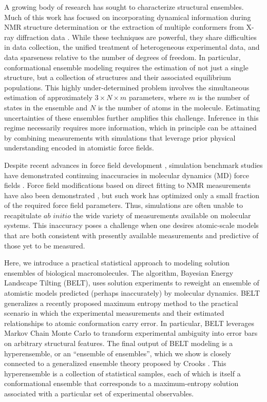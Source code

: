 \documentclass[12pt]{article}
\begin{document}
A growing body of research has sought to characterize structural ensembles.  Much of this work has focused on incorporating dynamical information during NMR structure determination  \cite{lindorff2005simultaneous, lange2008recognition} or the extraction of multiple conformers from X-ray diffraction data  \cite{depristo2004heterogeneity, lang2010automated}.  While these techniques are powerful, they share difficulties in data collection, the unified treatment of heterogeneous experimental data, and data sparseness relative to the number of degrees of freedom.  In particular, conformational ensemble modeling requires the estimation of not just a single structure, but a collection of structures and their associated equilibrium populations.  This highly under-determined problem involves the simultaneous estimation of approximately $3 \times N \times m$ parameters, where $m$ is the number of states in the ensemble and $N$ is the number of atoms in the molecule. Estimating uncertainties of these ensembles 
further 
amplifies this challenge.  Inference in this regime necessarily requires more information, which in principle can be attained by combining measurements with simulations that leverage prior physical understanding encoded in atomistic force fields. 

Despite recent advances in force field development \cite{best2008, lindorff2012systematic}, simulation benchmark studies have demonstrated continuing inaccuracies in molecular dynamics (MD) force fields \cite{beauchamp2012protein}.  Force field modifications based on direct fitting to NMR measurements have also been demonstrated \cite{li2011iterative, best2012optimization, nerenberg2011}, but such work has optimized only a small fraction of the required force field parameters.  Thus, simulations are often unable to recapitulate $ab$ $initio$ the wide variety of measurements available on molecular systems.  This inaccuracy poses a challenge when one desires atomic-scale models that are both consistent with presently available measurements and predictive of those yet to be measured.  

Here, we introduce a practical statistical approach to modeling solution ensembles of biological macromolecules.  The algorithm, Bayesian Energy Landscape Tilting (BELT), uses solution experiments to reweight an ensemble of atomistic models predicted (perhaps inaccurately) by molecular dynamics.  BELT generalizes a recently proposed maximum entropy method \cite{chodera2012} to the practical scenario in which the experimental measurements and their estimated relationships to atomic conformation carry error. In particular, BELT leverages Markov Chain Monte Carlo \cite{patil2010pymc} to transform experimental ambiguity into error bars on arbitrary structural features. The final output of BELT modeling is a hyperensemble, or an ``ensemble of ensembles'', which we show is closely connected to a generalized ensemble theory proposed by Crooks \cite{crooks2007beyond}. This hyperensemble is a collection of statistical samples, each of which is itself a conformational ensemble that corresponds to 
a maximum-entropy solution associated with a particular set of experimental observables. 
\end{document}
